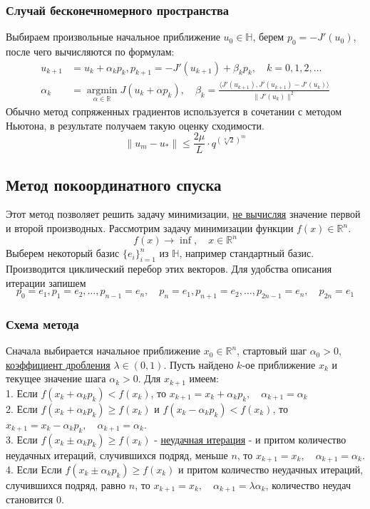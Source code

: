 \documentclass[A4]{article}
\begin{document}
\subsubsection{Случай бесконечномерного пространства}
Выбираем произвольные начальное приближение $u_0\in\mathbb{H}$, берем $p_0=-J'(u_0)$, после чего вычисляются по формулам:
\begin{equation*}
\begin{aligned}
u_{k+1}&=u_k+\alpha_{k}p_k,p_{k+1}=-J'(u_{k+1})+\beta_kp_k,\quad k=0,1,2,\ldots\\
\alpha_k&=\underset{\alpha\in\mathbb{R}}{\operatorname{argmin}}J(u_k+\alpha p_k),\quad\beta_k=\frac{\langle J'(u_{k+1}),J'(u_{k+1})-J'(u_k)\rangle}{\|J'(u_k)\|^2}
\end{aligned}
\end{equation*}
Обычно метод сопряженных градиентов используется в сочетании с методом Ньютона, в результате получаем такую оценку сходимости.
\begin{equation*}
\|u_m-u_*\|\leqslant\frac{2\mu}{L}\cdot q^{(\sqrt[n]{2})^m}
\end{equation*}
\subsection{Метод покоординатного спуска}
Этот метод позволяет решить задачу минимизации, \underline{не вычисляя} значение первой и второй производных. Рассмотрим задачу минимизации функции $f(x)\in\mathbb{R}^n$.
\begin{equation*}
f(x)\rightarrow\inf,\quad x\in\mathbb{R}^n
\end{equation*}
Выберем некоторый базис $\{e_i \}^n_{i=1}$ из $\mathbb{H}$, например стандартный базис. Производится циклический перебор этих векторов. Для удобства описания итерации запишем
\begin{equation*}
p_0=e_1,p_1=e_2,\ldots,p_{n-1}=e_n,\quad p_n=e_1,p_{n+1}=e_2,\ldots,p_{2n-1}=e_n,\quad p_{2n}=e_1
\end{equation*}
\subsubsection{Схема метода} 
Сначала выбирается начальное приближение $x_0\in\mathbb{R}^n$, стартовый шаг $\alpha_0>0$, \underline{коэффициент дробления} $\lambda\in(0,1)$. Пусть найдено $k$-ое приближение $x_k$ и текущее значение шага $\alpha_k>0$. Для $x_{k+1}$ имеем:\\
1. Если $f(x_k+\alpha_kp_k)<f(x_k)$, то $x_{k+1}=x_k+\alpha_kp_k,\quad\alpha_{k+1}=\alpha_{k}$\\
2. Если $f(x_k+\alpha_kp_k)\geqslant f(x_k)$ и $f(x_k-\alpha_kp_k)<f(x_k)$, то $x_{k+1}=x_k-\alpha_kp_k,\quad\alpha_{k+1}=\alpha_{k}$.\\
3. Если $f(x_k\pm\alpha_kp_k)\geqslant f(x_k)$ - \underline{неудачная итерация} - и притом количество неудачных итераций, случившихся подряд, меньше $n$, то $x_{k+1}=x_k,\quad\alpha_{k+1}=\alpha_{k}$.\\
4. Если Если $f(x_k\pm\alpha_kp_k)\geqslant f(x_k)$ и притом количество неудачных итераций, случившихся подряд, равно $n$, то $x_{k+1}=x_k,\quad\alpha_{k+1}=\lambda\alpha_{k}$, количество неудач становится $0$.\\
\end{document}
